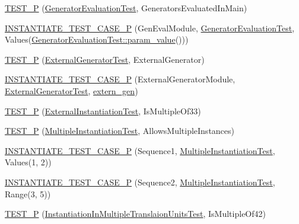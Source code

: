\begin{DoxyCompactItemize}
\item 
\mbox{\hyperlink{googletest-param-test-test_8cc_afb359adcaa80d8d4de1a139e16ddbbcd}{T\+E\+S\+T\+\_\+P}} (\mbox{\hyperlink{classGeneratorEvaluationTest}{Generator\+Evaluation\+Test}}, Generators\+Evaluated\+In\+Main)
\item 
\mbox{\hyperlink{googletest-param-test-test_8cc_a7bdfa4daa3eebd2b504e5028bef9e307}{I\+N\+S\+T\+A\+N\+T\+I\+A\+T\+E\+\_\+\+T\+E\+S\+T\+\_\+\+C\+A\+S\+E\+\_\+P}} (Gen\+Eval\+Module, \mbox{\hyperlink{classGeneratorEvaluationTest}{Generator\+Evaluation\+Test}}, Values(\mbox{\hyperlink{classGeneratorEvaluationTest_ac819769e32b738677401424deb3c8cbe}{Generator\+Evaluation\+Test\+::param\+\_\+value}}()))
\item 
\mbox{\hyperlink{googletest-param-test-test_8cc_a83249caca89bdaafc2b8b167ffe9e684}{T\+E\+S\+T\+\_\+P}} (\mbox{\hyperlink{classExternalGeneratorTest}{External\+Generator\+Test}}, External\+Generator)
\item 
\mbox{\hyperlink{googletest-param-test-test_8cc_ae25f264afdef06f540bc6444ef1cd9c9}{I\+N\+S\+T\+A\+N\+T\+I\+A\+T\+E\+\_\+\+T\+E\+S\+T\+\_\+\+C\+A\+S\+E\+\_\+P}} (External\+Generator\+Module, \mbox{\hyperlink{classExternalGeneratorTest}{External\+Generator\+Test}}, \mbox{\hyperlink{googletest-param-test2-test_8cc_a0f691f1461778d71f30b1fb1dea1cb50}{extern\+\_\+gen}})
\item 
\mbox{\hyperlink{googletest-param-test-test_8cc_aaa93e4bed0890e2fdf1d7ae232315753}{T\+E\+S\+T\+\_\+P}} (\mbox{\hyperlink{classExternalInstantiationTest}{External\+Instantiation\+Test}}, Is\+Multiple\+Of33)
\item 
\mbox{\hyperlink{googletest-param-test-test_8cc_ad1bbb42b9a1b3bf455ee0dcb4f8c4fb2}{T\+E\+S\+T\+\_\+P}} (\mbox{\hyperlink{classMultipleInstantiationTest}{Multiple\+Instantiation\+Test}}, Allows\+Multiple\+Instances)
\item 
\mbox{\hyperlink{googletest-param-test-test_8cc_a8eaead32d82b7e4961a8dbbdc188cf98}{I\+N\+S\+T\+A\+N\+T\+I\+A\+T\+E\+\_\+\+T\+E\+S\+T\+\_\+\+C\+A\+S\+E\+\_\+P}} (Sequence1, \mbox{\hyperlink{classMultipleInstantiationTest}{Multiple\+Instantiation\+Test}}, Values(1, 2))
\item 
\mbox{\hyperlink{googletest-param-test-test_8cc_a736a895e9af032653ea5deeac7379795}{I\+N\+S\+T\+A\+N\+T\+I\+A\+T\+E\+\_\+\+T\+E\+S\+T\+\_\+\+C\+A\+S\+E\+\_\+P}} (Sequence2, \mbox{\hyperlink{classMultipleInstantiationTest}{Multiple\+Instantiation\+Test}}, Range(3, 5))
\item 
\mbox{\hyperlink{googletest-param-test-test_8cc_aca1b0c41396a0db4f07796948da7d27a}{T\+E\+S\+T\+\_\+P}} (\mbox{\hyperlink{classInstantiationInMultipleTranslaionUnitsTest}{Instantiation\+In\+Multiple\+Translaion\+Units\+Test}}, Is\+Multiple\+Of42)

\end{DoxyCompactItemize}
